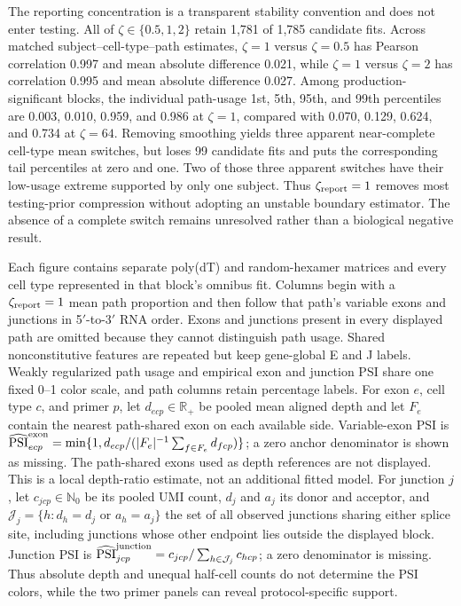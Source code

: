 \documentclass[11pt]{article}
\begin{document}
The reporting concentration is a transparent stability convention and does not enter testing. All of \(\zeta\in\{0.5,1,2\}\) retain 1,781 of 1,785 candidate fits. Across matched subject--cell-type--path estimates, \(\zeta=1\) versus \(\zeta=0.5\) has Pearson correlation 0.997 and mean absolute difference 0.021, while \(\zeta=1\) versus \(\zeta=2\) has correlation 0.995 and mean absolute difference 0.027. Among production-significant blocks, the individual path-usage 1st, 5th, 95th, and 99th percentiles are 0.003, 0.010, 0.959, and 0.986 at \(\zeta=1\), compared with 0.070, 0.129, 0.624, and 0.734 at \(\zeta=64\). Removing smoothing yields three apparent near-complete cell-type mean switches, but loses 99 candidate fits and puts the corresponding tail percentiles at zero and one. Two of those three apparent switches have their low-usage extreme supported by only one subject. Thus \(\zeta_{\rm report}=1\) removes most testing-prior compression without adopting an unstable boundary estimator. The absence of a complete switch remains unresolved rather than a biological negative result.

Each figure contains separate poly(dT) and random-hexamer matrices and every cell type represented in that block's omnibus fit. Columns begin with a \(\zeta_{\rm report}=1\) mean path proportion and then follow that path's variable exons and junctions in 5$'$-to-3$'$ RNA order. Exons and junctions present in every displayed path are omitted because they cannot distinguish path usage. Shared nonconstitutive features are repeated but keep gene-global E and J labels. Weakly regularized path usage and empirical exon and junction PSI share one fixed 0--1 color scale, and path columns retain percentage labels. For exon \(e\), cell type \(c\), and primer \(p\), let \(d_{ecp}\in\mathbb R_+\) be pooled mean aligned depth and let \(F_e\) contain the nearest path-shared exon on each available side. Variable-exon PSI is \(\widehat{\operatorname{PSI}}^{\rm exon}_{ecp}=\min\{1,d_{ecp}/(|F_e|^{-1}\sum_{f\in F_e}d_{fcp})\}\); a zero anchor denominator is shown as missing. The path-shared exons used as depth references are not displayed. This is a local depth-ratio estimate, not an additional fitted model. For junction \(j\), let \(c_{jcp}\in\mathbb N_0\) be its pooled UMI count, \(d_j\) and \(a_j\) its donor and acceptor, and \(\mathcal J_j=\{h:d_h=d_j\text{ or }a_h=a_j\}\) the set of all observed junctions sharing either splice site, including junctions whose other endpoint lies outside the displayed block. Junction PSI is \(\widehat{\operatorname{PSI}}^{\rm junction}_{jcp}=c_{jcp}/\sum_{h\in\mathcal J_j}c_{hcp}\); a zero denominator is missing. Thus absolute depth and unequal half-cell counts do not determine the PSI colors, while the two primer panels can reveal protocol-specific support.
\end{document}
